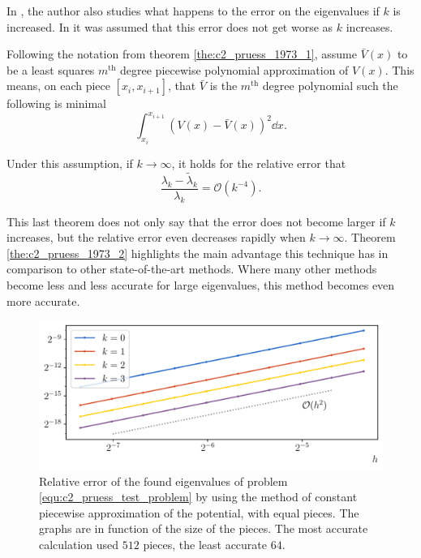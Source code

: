 In \cite{pruess_estimating_1973}, the author also studies what happens to the error on the eigenvalues if $k$ is increased. In \cite{canosa_new_1970} it was assumed that this error does not get worse as $k$ increases.

\begin{theorem}[Pruess 1973]\label{the:c2_pruess_1973_2}
    Following the notation from theorem \ref{the:c2_pruess_1973_1}, assume $\bar{V}(x)$ to be a least squares $m^\text{th}$ degree piecewise polynomial approximation of $V(x)$. This means, on each piece $[x_i, x_{i+1}]$, that $\bar{V}$ is the $m^\text{th}$ degree polynomial such the following is minimal
    $$
        \int_{x_i}^{x_{i+1}} \left(V(x) - \bar{V}(x)\right)^2 \dd x \text{.}
    $$

    Under this assumption, if $k \to \infty$, it holds for the relative error that
    $$
        \frac{\lambda_k - \tilde{\lambda}_k}{\lambda_k} = \mathcal{O}(k^{-4})\text{.}
    $$
\end{theorem}

This last theorem does not only say that the error does not become larger if $k$ increases, but the relative error even decreases rapidly when $k \to \infty$. Theorem \ref{the:c2_pruess_1973_2} highlights the main advantage this technique has in comparison to other state-of-the-art methods. Where many other methods become less and less accurate for large eigenvalues, this method becomes even more accurate.

\begin{figure}
    \begin{center}
        \includegraphics[width=\textwidth]{img/chapter2/pruess_h_error.pdf}
    \end{center}
    \caption{Relative error of the found eigenvalues of problem \eqref{equ:c2_pruess_test_problem} by using the method of constant piecewise approximation of the potential, with equal pieces. The graphs are in function of the size of the pieces. The most accurate calculation used $512$ pieces, the least accurate $64$.}
    \label{fig:c2_pruess_h_error}
\end{figure}

